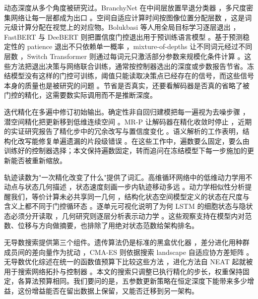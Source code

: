 \documentclass[12pt,a4paper]{article}
\begin{document}
动态深度从多个角度被研究过。BranchyNet 在中间层放置早退分类器 \citep{teerapittayanon2016branchynet}，多尺度密集网络让每一层都成为出口 \citep{huang2018multiscale}。空间自适应计算时间按图像位置分配层数 \citep{figurnov2017spatially}，这是词元级计算分配在视觉上的对应物。Bolukbasi 等人用全局目标学习逐层退出 \citep{bolukbasi2017adaptive}，FastBERT 与 DeeBERT 则把置信度门控退出用于预训练语言模型 \citep{liu2020fastbert,xin2020deebert}。基于预测稳定性的 patience 退出不只依赖单一概率 \citep{zhou2020patience}，mixture-of-depths 让不同词元经过不同层数 \citep{raposo2024mixture}，Switch Transformer 则通过每词元只激活部分参数来规模化条件计算 \citep{fedus2022switch}。这些方法把退出决策与网络联合训练，通常按控制器选出的深度或步数报告节省。冻结模型没有这样的门控可训练，阈值只能读取决策点已经存在的信号，而这些信号本身的质量也是被研究的问题 \citep{jiang2018trust,tian2023calibration}。节省是否真实，还要看解码器是否真的省略了被门控的精化，这需要数实际调用而不是推断深度。

迭代精化在多遍中修订初始输出。确定性非自回归建模把每一遍视为去噪步骤 \citep{lee2018deterministic}，潜空间精化把更新移到低维连续空间 \citep{lee2020iterative}。MR-P 让解码器在精化收敛时停止 \citep{cheng2022mrp}，近期的实证研究报告了精化步中的冗余改写与置信度变化 \citep{xiao2025empirical}。语义解析的工作表明，结构化改写能修复单遍遗漏的片段级错误 \citep{geng2021rewrite}。在这些工作中，遍数要么固定，要么由训练好的控制器选择；本文保持遍数固定，转而追问在冻结模型下每一步施加的更新能否被重新缩放。

轨迹读数为"一次精化改变了什么"提供了词汇。高维循环网络中的低维动力学用不动点与状态几何描述 \citep{sussillo2013blackbox,vyas2020population}，状态速度刻画一步内轨迹移动多远 \citep{haviv2019memory}。动力学相似性分析提醒我们，等价计算未必共享同一几何 \citep{ostrow2023dsa}，结构化状态空间模型定义的状态在尺度与含义上都不同于门控循环态 \citep{gu2022s4,gu2023mamba}。逐单元可视化说明了为何 LSTM 的细胞状态与隐状态必须分开读取 \citep{karpathy2015rnn}，几何研究则逐层分析表示动力学 \citep{horoi2020geometry}。这些观察支持在模型内对范数、位移与方向做摘要，也排除了用绝对状态范数给架构排名。

无导数搜索提供第三个组件。遗传算法仍是标准的黑盒优化器 \citep{whitley1994tutorial}，差分进化用种群成员间的差向量作为扰动 \citep{storn1997de,das2011survey}，CMA-ES 则依据搜索 landscape 自适应协方差矩阵 \citep{hansen2001cma,hansen2003cma}。无导数优化综述在统一的函数值预算下比较这些方法 \citep{rios2013df}，进化方法自 NEAT 起就被用于搜索网络拓扑与控制器 \citep{stanley2002neat,such2017neuro}。本文的搜索只调整已执行精化的步长，权重保持固定，各算法预算相同。我们要问的是，五参数更新策略在恒定深度下能带来多少增益，这份增益能否在留出数据上保留，又能否迁移到另一架构。
\end{document}
